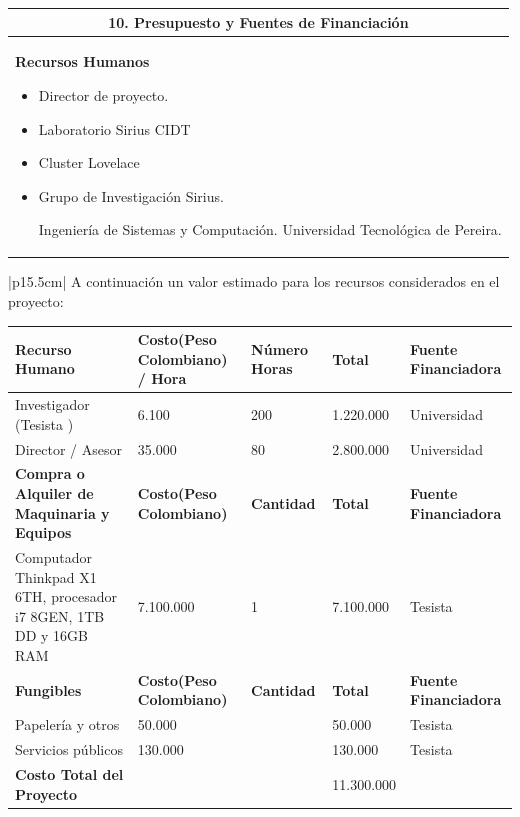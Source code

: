 \documentclass[letter,12pt]{article}
\begin{document}
\begin{center}
\begin{tabular}{|p{15.5cm}|}
\hline
\multicolumn{1}{|c|}{ \textbf{10. Presupuesto y Fuentes de Financiación}}\\
\hline

\textbf{Recursos Humanos}
\begin{itemize}
    \item Director de proyecto.
    \item Laboratorio Sirius CIDT
    \item Cluster Lovelace
    \item Grupo de Investigación Sirius. \par
    Ingeniería de Sistemas y Computación. Universidad Tecnológica de Pereira.
\end{itemize}\\
\hline
\end{tabular}
\end{center}
\begin{center}
\begin{tabular}{|p{15.5cm}|}
\hline
	A continuación un valor estimado para los recursos considerados en el proyecto:
	\begin{center}
    \begin{tabular}{|p{2.5cm}|p{3cm}|p{2cm}|p{2cm}|p{3cm}|}
    \hline
    \textbf{Recurso Humano} & \textbf{Costo(Peso Colombiano) / Hora } & \textbf{Número Horas} & \textbf{Total} & \textbf{Fuente Financiadora} \\
    \hline
    Investigador (Tesista   ) & 6.100 & 200 & 1.220.000 & Universidad \\
    \hline    \hline
    Director / Asesor & 35.000 & 80 & 2.800.000 & Universidad \\
    \hline
    \textbf{Compra o Alquiler de Maquinaria y Equipos} & \textbf{Costo(Peso Colombiano) } & \textbf{Cantidad} & \textbf{Total} & \textbf{Fuente Financiadora} \\
    \hline
    Computador Thinkpad X1 6TH, procesador i7 8GEN, 1TB DD y 16GB RAM & 7.100.000 & 1 & 7.100.000 & Tesista  \\
    \hline

    \textbf{Fungibles} & \textbf{Costo(Peso Colombiano) } & \textbf{Cantidad} & \textbf{Total} & \textbf{Fuente Financiadora} \\
    \hline
    Papelería y otros & 50.000 &  & 50.000 & Tesista \\
    \hline
    Servicios públicos & 130.000 &  & 130.000 & Tesista  \\
    \hline
    \textbf{Costo Total del Proyecto} &  &  & 11.300.000 &  \\
    \hline
    \end{tabular}
    \end{center}\\
\hline
\end{tabular}
\end{center}
\end{document}
